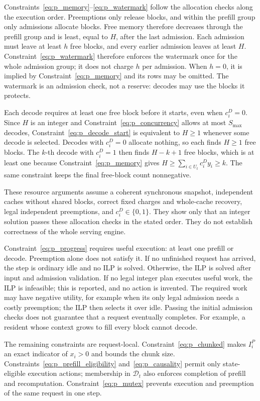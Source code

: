 \documentclass[11pt]{article}
\begin{document}
Constraints~\ref{eq:p_memory}--\ref{eq:p_watermark} follow the allocation checks along the execution order. Preemptions only release blocks, and within the prefill group only admissions allocate blocks. Free memory therefore decreases through the prefill group and is least, equal to \(H\), after the last admission. Each admission must leave at least \(h\) free blocks, and every earlier admission leaves at least \(H\). Constraint~\ref{eq:p_watermark} therefore enforces the watermark once for the whole admission group; it does not charge \(h\) per admission. When \(h=0\), it is implied by Constraint~\ref{eq:p_memory} and its rows may be omitted. The watermark is an admission check, not a reserve: decodes may use the blocks it protects.

Each decode requires at least one free block before it starts, even when \(c_i^D=0\). Since \(H\) is an integer and Constraint~\ref{eq:p_concurrency} allows at most \(S_{\max}\) decodes, Constraint~\ref{eq:p_decode_start} is equivalent to \(H\ge1\) whenever some decode is selected. Decodes with \(c_i^D=0\) allocate nothing, so each finds \(H\ge1\) free blocks. The \(k\)-th decode with \(c_i^D=1\) then finds \(H-k+1\) free blocks, which is at least one because Constraint~\ref{eq:p_memory} gives \(H\ge\sum_{i\in U_t}c_i^D y_i\ge k\). The same constraint keeps the final free-block count nonnegative.

These resource arguments assume a coherent synchronous snapshot, independent caches without shared blocks, correct fixed charges and whole-cache recovery, legal independent preemptions, and \(c_i^D\in\{0,1\}\). They show only that an integer solution passes these allocation checks in the stated order. They do not establish correctness of the whole serving engine.

Constraint~\ref{eq:p_progress} requires useful execution: at least one prefill or decode. Preemption alone does not satisfy it. If no unfinished request has arrived, the step is ordinary idle and no ILP is solved. Otherwise, the ILP is solved after input and admission validation. If no legal integer plan executes useful work, the ILP is infeasible; this is reported, and no action is invented. The required work may have negative utility, for example when its only legal admission needs a costly preemption; the ILP then selects it over idle. Passing the initial admission checks does not guarantee that a request eventually completes. For example, a resident whose context grows to fill every block cannot decode.

The remaining constraints are request-local. Constraint~\ref{eq:p_chunked} makes \(I_i^P\) an exact indicator of \(x_i>0\) and bounds the chunk size. Constraints~\ref{eq:p_prefill_eligibility} and~\ref{eq:p_causality} permit only state-eligible execution actions; membership in \(\mathcal{D}_t\) also enforces completion of prefill and recomputation. Constraint~\ref{eq:p_mutex} prevents execution and preemption of the same request in one step.
\end{document}
